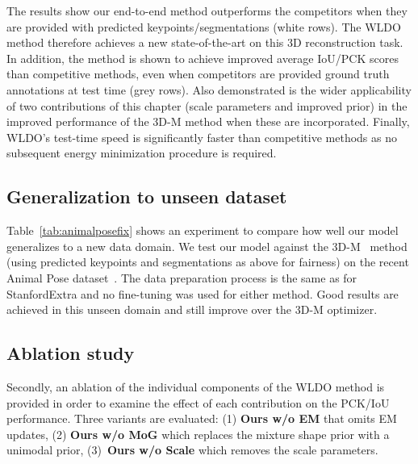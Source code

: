 The results show our end-to-end method outperforms the competitors when they are provided with predicted keypoints/segmentations (white rows). The WLDO method therefore achieves a new state-of-the-art on this 3D reconstruction task. In addition, the method is shown to achieve improved average IoU/PCK scores than competitive methods, even when competitors are provided ground truth annotations at test time (grey rows). Also demonstrated is the wider applicability of two contributions of this chapter (scale parameters and improved prior) in the improved performance of the 3D-M method when these are incorporated. Finally, WLDO's test-time speed is significantly faster than competitive methods as no subsequent energy minimization procedure is required. 




\subsection{Generalization to unseen dataset}

Table~\ref{tab:animalposefix} shows an experiment to compare how well our model generalizes to a new data domain. We test our model against the 3D-M~\cite{zuffi2017menagerie} method (using predicted keypoints and segmentations as above for fairness) on the recent Animal Pose dataset~\cite{animalpose}. The data preparation process is the same as for StanfordExtra and no fine-tuning was used for either method. Good results are achieved in this unseen domain and still improve over the 3D-M optimizer.



\subsection{Ablation study}

Secondly, an ablation of the individual components of the WLDO method is provided in order to examine the effect of each contribution on the PCK/IoU performance. Three variants are evaluated: (1) \textbf{Ours w/o EM} that omits EM updates, (2) \textbf{Ours w/o MoG} which replaces the mixture shape prior with a unimodal prior, (3)~\textbf{Ours w/o Scale} which removes the scale parameters. 

